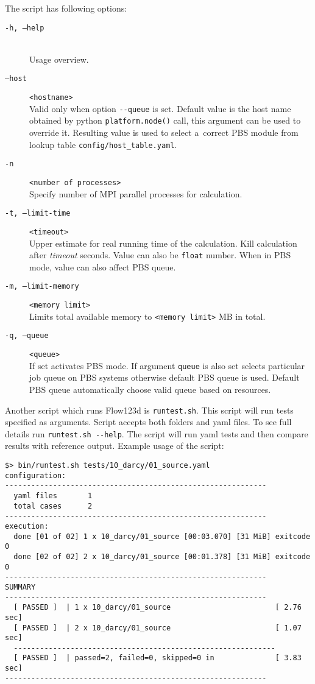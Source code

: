 The script has following options:

\begin{description}
  \item[{\tt -h, --help}] \hfill\\
  	Usage overview.
  \item[{\tt --host}] \verb'<hostname>' \hfill\\
  		Valid only when option \verb'--queue' is set.
        Default value is the host name obtained by python \verb'platform.node()' call, this argument can be used to override it.
        Resulting value is used to select a~correct PBS module from lookup table \verb'config/host_table.yaml'.
  \item[{\tt -n}] \verb'<number of processes>' \hfill\\
  	Specify number of MPI parallel processes for calculation.
  \item[{\tt -t, --limit-time}] \verb'<timeout>' \hfill\\
  	Upper estimate for real running time of the calculation. Kill calculation after {\it timeout} seconds.
  	Value can also be \verb'float' number. When in PBS mode, value can also affect PBS queue.
  \item[{\tt -m, --limit-memory}] \verb'<memory limit>' \hfill\\
  	Limits total available memory to \verb'<memory limit>' MB in total.
  \item[{\tt -q, --queue}] \verb'<queue>' \hfill\\
  		If set activates PBS mode. If argument \verb'queue' is also set selects particular job queue
  		on PBS systems otherwise default PBS queue is used. Default PBS queue automatically
  		choose valid queue based on resources.
\end{description}


Another script which runs Flow123d is \verb'runtest.sh'. This script will run tests specified as arguments. Script accepts both folders
and yaml files. To see full details run \verb'runtest.sh --help'. The script will run yaml tests and then compare results with reference
output. Example usage of the script:

\begin{verbatim}
$> bin/runtest.sh tests/10_darcy/01_source.yaml
configuration:
------------------------------------------------------------
  yaml files       1
  total cases      2
------------------------------------------------------------
execution:
  done [01 of 02] 1 x 10_darcy/01_source [00:03.070] [31 MiB] exitcode 0
  done [02 of 02] 2 x 10_darcy/01_source [00:01.378] [31 MiB] exitcode 0
------------------------------------------------------------
SUMMARY 
------------------------------------------------------------
  [ PASSED ]  | 1 x 10_darcy/01_source                        [ 2.76 sec] 
  [ PASSED ]  | 2 x 10_darcy/01_source                        [ 1.07 sec] 
  ------------------------------------------------------------
  [ PASSED ]  | passed=2, failed=0, skipped=0 in              [ 3.83 sec]
------------------------------------------------------------
\end{verbatim}
